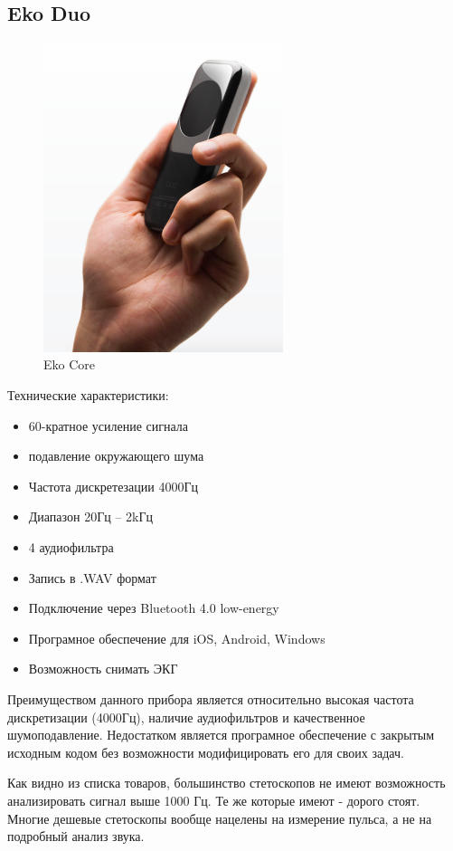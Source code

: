 \documentclass[../paper.tex]{subfiles}
\begin{document}
\subsection{Eko Duo}
\begin{figure}[H]
\centering
\includegraphics[width=7cm]{images/eko-duo}
\caption{Eko Core}
\end{figure}

Технические характеристики:\cite{eko-duo}
\begin{itemize}
  \item 60-кратное усиление сигнала
  \item подавление окружающего шума
  \item Частота дискретезации 4000Гц
  \item Диапазон 20Гц – 2kГц
  \item 4 аудиофильтра
  \item Запись в .WAV формат
  \item Подключение через Bluetooth 4.0 low-energy
  \item Програмное обеспечение для iOS, Android, Windows
  \item Возможность снимать ЭКГ
\end{itemize}

Преимуществом данного прибора является относительно высокая частота дискретизации (4000Гц), наличие аудиофильтров и качественное шумоподавление. Недостатком является програмное обеспечение с закрытым исходным кодом без возможности модифицировать его для своих задач.

Как видно из списка товаров, большинство стетоскопов не имеют возможность анализировать сигнал выше 1000 Гц. Те же которые имеют - дорого стоят. Многие дешевые стетоскопы вообще нацелены на измерение пульса, а не на подробный анализ звука.
\end{document}
